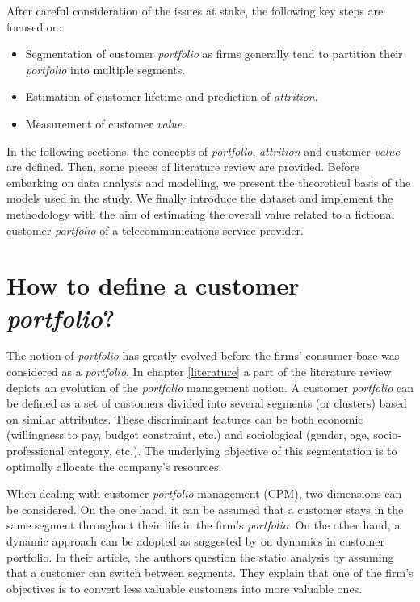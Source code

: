 \documentclass[
]{book}
\providecommand{\tightlist}{%
  \setlength{\itemsep}{0pt}\setlength{\parskip}{0pt}}
\begin{document}
After careful consideration of the issues at stake, the following key steps are focused on:

\begin{itemize}
\tightlist
\item
  Segmentation of customer \emph{portfolio} as firms generally tend to partition their \emph{portfolio} into multiple segments.
\item
  Estimation of customer lifetime and prediction of \emph{attrition}.
\item
  Measurement of customer \emph{value.}
\end{itemize}

In the following sections, the concepts of \emph{portfolio}, \emph{attrition} and customer \emph{value} are defined. Then, some pieces of literature review are provided. Before embarking on data analysis and modelling, we present the theoretical basis of the models used in the study. We finally introduce the dataset and implement the methodology with the aim of estimating the overall value related to a fictional customer \emph{portfolio} of a telecommunications service provider.

\hypertarget{portfoliodef}{%
\section{\texorpdfstring{How to define a customer \emph{portfolio}?}{How to define a customer portfolio?}}\label{portfoliodef}}

The notion of \emph{portfolio} has greatly evolved before the firms' consumer base was considered as a \emph{portfolio}. In chapter \ref{literature} a part of the literature review depicts an evolution of the \emph{portfolio} management notion. A customer \emph{portfolio} can be defined as a set of customers divided into several segments (or clusters) based on similar attributes. These discriminant features can be both economic (willingness to pay, budget constraint, etc.) and sociological (gender, age, socio-professional category, etc.). The underlying objective of this segmentation is to optimally allocate the company's resources.

When dealing with customer \emph{portfolio} management (CPM), two dimensions can be considered. On the one hand, it can be assumed that a customer stays in the same segment throughout their life in the firm's \emph{portfolio}. On the other hand, a dynamic approach can be adopted as suggested by \citet{MANAGING_DYNAMICS_CUSTOMER_PORTFOLIO} on dynamics in customer portfolio. In their article, the authors question the static analysis by assuming that a customer can switch between segments. They explain that one of the firm's objectives is to convert less valuable customers into more valuable ones.
\end{document}
